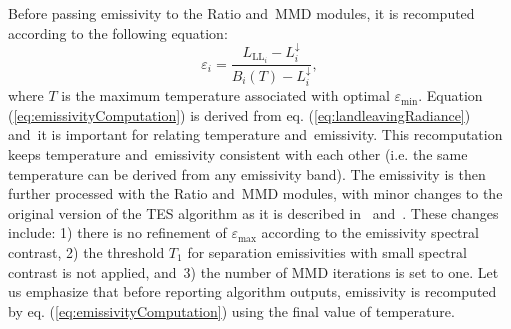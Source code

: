 Before passing emissivity to the Ratio and~MMD modules, it is  {recomputed} according to the following equation:
\begin{equation}
\varepsilon_{ {i}} = \frac{L_{\mathrm{LL}_{ {i}}} - L^\downarrow_{ {i}}}{B_{ {i}}(T) - L^\downarrow_{ {i}}},
\label{eq:emissivityComputation}
\end{equation}
where $T$ is the maximum temperature associated with optimal $\varepsilon_\mathrm{min}$. Equation (\ref{eq:emissivityComputation}) is derived from eq. (\ref{eq:landleavingRadiance}) and~it is important for relating temperature and~emissivity. This recomputation keeps temperature and~emissivity consistent with each other (i.e. the same temperature can be derived from any emissivity band). The emissivity is then further processed with the Ratio and~MMD modules, with minor changes to  {the} original version of the TES algorithm as it is described in~\cite{GR99} and~\cite{GR98}. These changes include: 1) there is no refinement of $\varepsilon_\mathrm{max}$ according to the emissivity spectral contrast, 2) the threshold $T_1$ for separation emissivities with small spectral contrast is not applied, and~3) the number of MMD iterations is set to one. Let us emphasize that before reporting algorithm outputs, emissivity is recomputed by eq. (\ref{eq:emissivityComputation}) using the final value of temperature.